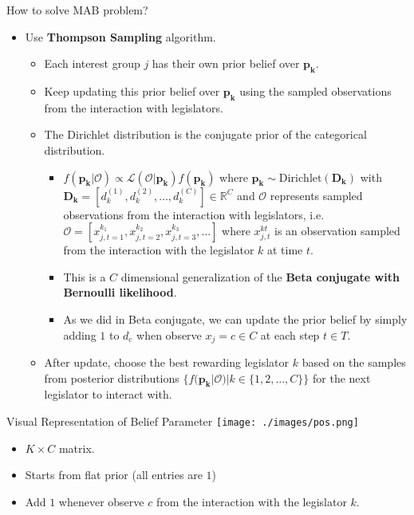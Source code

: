 \documentclass{beamer}
\begin{document}
	\begin{frame}{How to solve MAB problem?}
		\begin{itemize}
			\item Use \textbf{Thompson Sampling} algorithm.
			\begin{itemize}
				\item Each interest group $j$ has their own prior belief over $\mathbf{p_k}$.
				\item Keep updating this prior belief over $\mathbf{p_k}$ using the sampled observations from the interaction with legislators.
				\item The Dirichlet distribution is the conjugate prior of the categorical distribution.
				\begin{itemize}
					\item $f(\mathbf{p_k} | \mathcal{O}) \propto \mathcal{L(\mathcal{O | \mathbf{p_k}})} f(\mathbf{p_k})$ where $\mathbf{p_k} \sim \operatorname{Dirichlet(\mathbf{D_k})}$ with $\mathbf{D_k} = [d_k^{(1)}, d_k^{(2)}, \hdots, d_k^{(C)}] \in \mathbb{R}^C $ and $\mathcal{O}$ represents sampled observations from the interaction with legislators, i.e. $\mathcal{O} = [x_{j, t=1}^{k_1}, x_{j, t=2}^{k_2}, x_{j, t=3}^{k_3}, \hdots]$ where $x_{j, t}^{kt}$ is an observation sampled from the interaction with the legislator $k$ at time $t$. 
					\item This is a $C$ dimensional generalization of the \textbf{Beta conjugate with Bernoulli likelihood}.
					\item As we did in Beta conjugate, we can update the prior belief by simply adding $1$ to $d_c$ when observe $x_j = c \in C$ at each step $t \in T$.
				\end{itemize}
				\item After update, choose the best rewarding legislator $k$ based on the samples from posterior distributions $\{f(\mathbf{p_k} | \mathcal{O})| k \in \{1, 2, \hdots, C\}\}$ for the next legislator to interact with.
			\end{itemize}
		\end{itemize}
	\end{frame}

	\begin{frame}{Visual Representation of Belief Parameter}
		\centering	\texttt{[image: ./images/pos.png]}
		\begin{itemize}
			\item $K \times C$ matrix. 
			\item Starts from flat prior (all entries are $1$) 
			\item Add $1$ whenever observe $c$ from the interaction with the legislator $k$.
		\end{itemize}
	\end{frame}
\end{document}
